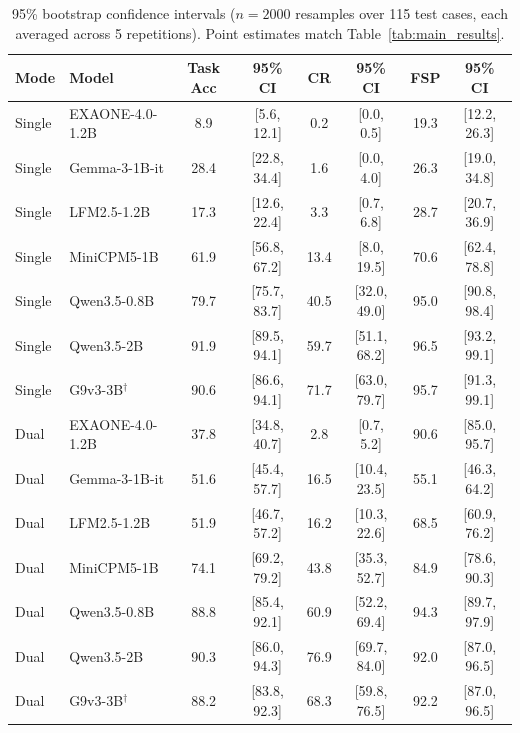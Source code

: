 \begin{table}[h]
\centering
\small
\caption{95\% bootstrap confidence intervals ($n=2000$ resamples over 115 test cases, each averaged across 5 repetitions). Point estimates match Table~\ref{tab:main_results}.}
\label{tab:bootstrap_cis}
\begin{tabular}{@{}ll|cc|cc|cc@{}}
\toprule
\textbf{Mode} & \textbf{Model} & \textbf{Task Acc} & \textbf{95\% CI} & \textbf{CR} & \textbf{95\% CI} & \textbf{FSP} & \textbf{95\% CI} \\
\midrule
Single & EXAONE-4.0-1.2B & 8.9 & [5.6, 12.1] & 0.2 & [0.0, 0.5] & 19.3 & [12.2, 26.3] \\
Single & Gemma-3-1B-it & 28.4 & [22.8, 34.4] & 1.6 & [0.0, 4.0] & 26.3 & [19.0, 34.8] \\
Single & LFM2.5-1.2B & 17.3 & [12.6, 22.4] & 3.3 & [0.7, 6.8] & 28.7 & [20.7, 36.9] \\
Single & MiniCPM5-1B & 61.9 & [56.8, 67.2] & 13.4 & [8.0, 19.5] & 70.6 & [62.4, 78.8] \\
Single & Qwen3.5-0.8B & 79.7 & [75.7, 83.7] & 40.5 & [32.0, 49.0] & 95.0 & [90.8, 98.4] \\
Single & Qwen3.5-2B & 91.9 & [89.5, 94.1] & 59.7 & [51.1, 68.2] & 96.5 & [93.2, 99.1] \\
Single & G9v3-3B$^\dagger$ & 90.6 & [86.6, 94.1] & 71.7 & [63.0, 79.7] & 95.7 & [91.3, 99.1] \\
\midrule
Dual & EXAONE-4.0-1.2B & 37.8 & [34.8, 40.7] & 2.8 & [0.7, 5.2] & 90.6 & [85.0, 95.7] \\
Dual & Gemma-3-1B-it & 51.6 & [45.4, 57.7] & 16.5 & [10.4, 23.5] & 55.1 & [46.3, 64.2] \\
Dual & LFM2.5-1.2B & 51.9 & [46.7, 57.2] & 16.2 & [10.3, 22.6] & 68.5 & [60.9, 76.2] \\
Dual & MiniCPM5-1B & 74.1 & [69.2, 79.2] & 43.8 & [35.3, 52.7] & 84.9 & [78.6, 90.3] \\
Dual & Qwen3.5-0.8B & 88.8 & [85.4, 92.1] & 60.9 & [52.2, 69.4] & 94.3 & [89.7, 97.9] \\
Dual & Qwen3.5-2B & 90.3 & [86.0, 94.3] & 76.9 & [69.7, 84.0] & 92.0 & [87.0, 96.5] \\
Dual & G9v3-3B$^\dagger$ & 88.2 & [83.8, 92.3] & 68.3 & [59.8, 76.5] & 92.2 & [87.0, 96.5] \\
\bottomrule
\end{tabular}
\end{table}